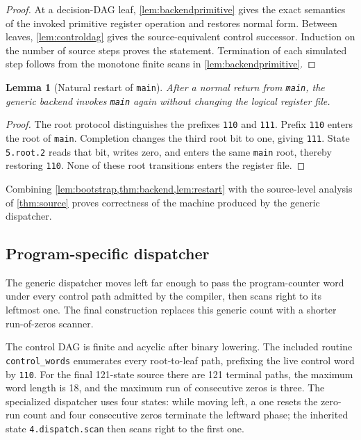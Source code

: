 \documentclass[10pt]{article}
\newtheorem{lemma}[theorem]{Lemma}
\theoremstyle{definition}
\begin{document}
\begin{proof}
At a decision-DAG leaf, \cref{lem:backendprimitive} gives the exact semantics
of the invoked primitive register operation and restores normal form.
Between leaves, \cref{lem:controldag} gives the source-equivalent control
successor.  Induction on the number of source steps proves the statement.
Termination of each simulated step follows from the monotone finite scans in
\cref{lem:backendprimitive}.
\end{proof}

\begin{lemma}[Natural restart of \texttt{main}]
\label{lem:restart}
After a normal return from \texttt{main}, the generic backend invokes
\texttt{main} again without changing the logical register file.
\end{lemma}

\begin{proof}
The root protocol distinguishes the prefixes \texttt{110} and \texttt{111}.
Prefix \texttt{110} enters the root of \texttt{main}.  Completion changes the
third root bit to one, giving \texttt{111}.  State \texttt{5.root.2} reads
that bit, writes zero, and enters the same \texttt{main} root, thereby
restoring \texttt{110}.  None of these root transitions enters the register
file.
\end{proof}

Combining \cref{lem:bootstrap,thm:backend,lem:restart} with the source-level
analysis of \cref{thm:source} proves correctness of the machine produced by
the generic dispatcher.

\subsection{Program-specific dispatcher}

The generic dispatcher moves left far enough to pass the program-counter word
under every control path admitted by the compiler, then scans right to its
leftmost one.  The final construction replaces this generic count with a
shorter run-of-zeros scanner.

The control DAG is finite and acyclic after binary lowering.  The included
routine \texttt{control\_words} enumerates every root-to-leaf path, prefixing
the live control word by \texttt{110}.  For the final 121-state source there
are 121 terminal paths, the maximum word length is 18, and the maximum run of
consecutive zeros is three.  The specialized dispatcher uses four states:
while moving left, a one resets the zero-run count and four consecutive zeros
terminate the leftward phase; the inherited state
\texttt{4.dispatch.scan} then scans right to the first one.
\end{document}
